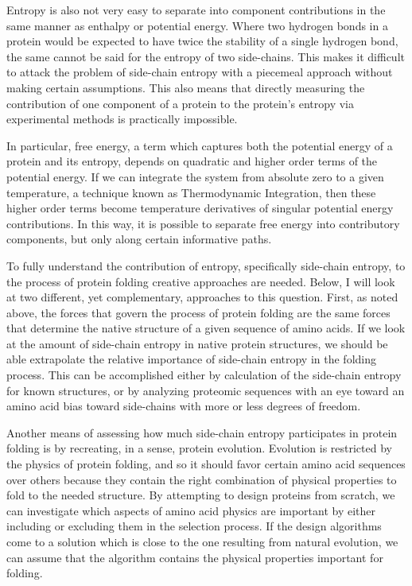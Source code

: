 Entropy is also not very easy to separate into component contributions in the same manner as enthalpy or potential energy\cite{Brady:1997p318}. Where two hydrogen bonds in a protein would be expected to have twice the stability of a single hydrogen bond, the same cannot be said for the entropy of two side-chains. This makes it difficult to attack the problem of side-chain entropy with a piecemeal approach without making certain assumptions. This also means that directly measuring the contribution of one component of a protein to the protein's entropy via experimental methods is practically impossible.

In particular, free energy, a term which captures both the potential energy of a protein and its entropy, depends on quadratic and higher order terms of the potential energy\cite{Brady:1996p394}. If we can integrate the system from absolute zero to a given temperature, a technique known as Thermodynamic Integration, then these higher order terms become temperature derivatives of singular potential energy contributions. In this way, it is possible to separate free energy into contributory components, but only along certain informative paths.

To fully understand the contribution of entropy, specifically side-chain entropy, to the process of protein folding creative approaches are needed. Below, I will look at two different, yet complementary, approaches to this question. First, as noted above, the forces that govern the process of protein folding are the same forces that determine the native structure of a given sequence of amino acids. If we look at the amount of side-chain entropy in native protein structures, we should be able extrapolate the relative importance of side-chain entropy in the folding process. This can be accomplished either by calculation of the side-chain entropy for known structures, or by analyzing proteomic sequences with an eye toward an amino acid bias toward side-chains with more or less degrees of freedom.

Another means of assessing how much side-chain entropy participates in protein folding is by recreating, in a sense, protein evolution. Evolution is restricted by the physics of protein folding, and so it should favor certain amino acid sequences over others because they contain the right combination of physical properties to fold to the needed structure. By attempting to design proteins from scratch, we can investigate which aspects of amino acid physics are important by either including or excluding them in the selection process. If the design algorithms come to a solution which is close to the one resulting from natural evolution, we can assume that the algorithm contains the physical properties important for folding.